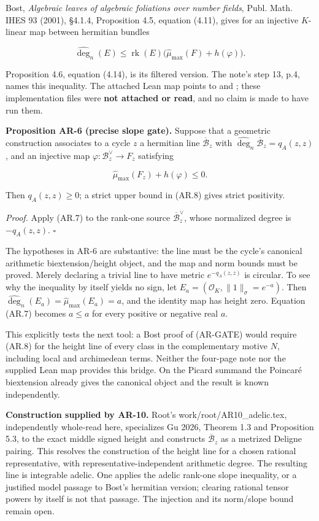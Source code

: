 \documentclass[11pt,a4paper]{article}
\begin{document}
Bost, \emph{Algebraic leaves of algebraic foliations over number
fields}, Publ. Math. IHES 93 (2001), §4.1.4, Proposition 4.5, equation
(4.11), gives for an injective \(K\)-linear map between hermitian
bundles

\[
\widehat{\deg}_{n}(E)
\le\operatorname{rk}(E)\bigl(\widehat\mu_{\max}(F)+h(\varphi)\bigr).
\tag{AR.7}
\]

Proposition 4.6, equation (4.14), is its filtered version. The note's
step 13, p.4, names this inequality. The attached Lean map points to
and ; these
implementation files were \textbf{not attached or read}, and no claim is
made to have run them.

\textbf{Proposition AR-6 (precise slope gate).} Suppose that a geometric
construction associates to a cycle \(z\) a hermitian line
\(\overline{\mathcal B}_z\) with
\(\widehat{\deg}_n\overline{\mathcal B}_z=q_A(z,z)\), and an injective
map \(\varphi:\mathcal B_z^\vee\to F_z\) satisfying

\[
\widehat\mu_{\max}(F_z)+h(\varphi)\le0.
\tag{AR.8}
\]

Then \(q_A(z,z)\ge0\); a strict upper bound in (AR.8) gives strict
positivity.

\emph{Proof.} Apply (AR.7) to the rank-one source
\(\overline{\mathcal B}_z^\vee\), whose normalized degree is
\(-q_A(z,z)\). \(\square\)

The hypotheses in AR-6 are substantive: the line must be the cycle's
canonical arithmetic biextension/height object, and the map and norm
bounds must be proved. Merely declaring a trivial line to have metric
\(e^{-q_A(z,z)}\) is circular. To see why the inequality by itself
yields no sign, let \(E_a=(\mathcal O_K,\|1\|_\sigma=e^{-a})\). Then
\(\widehat{\deg}_n(E_a)=\widehat\mu_{\max}(E_a)=a\), and the identity
map has height zero. Equation (AR.7) becomes \(a\le a\) for every
positive or negative real \(a\).

This explicitly tests the next tool: a Bost proof of (AR-GATE) would
require (AR.8) for the height line of every class in the complementary
motive \(N\), including local and archimedean terms. Neither the
four-page note nor the supplied Lean map provides this bridge. On the
Picard summand the Poincaré biextension already gives the canonical
object and the result is known independently.

\textbf{Construction supplied by AR-10.} Root's
work/root/AR10\_adelic.tex, independently whole-read here, specializes
Gu 2026, Theorem 1.3 and Proposition 5.3, to the exact middle signed
height and constructs \(\overline{\mathcal B}_z\) as a metrized Deligne
pairing. This resolves the construction of the height line for a chosen
rational representative, with representative-independent arithmetic
degree. The resulting line is integrable adelic. One applies the adelic
rank-one slope inequality, or a justified model passage to Bost's
hermitian version; clearing rational tensor powers by itself is not that
passage. The injection and its norm/slope bound remain open.
\end{document}
